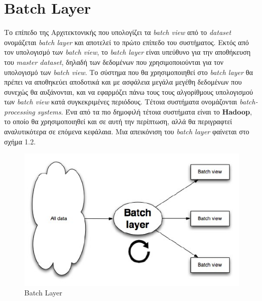 \section{Batch Layer}
Το επίπεδο της Αρχιτεκτονικής που υπολογίζει τα \textit{batch view} από το \textit{dataset} ονομάζεται \textit{batch layer} και αποτελεί το πρώτο επίπεδο του συστήματος. Εκτός από τον υπολογισμό των \textit{batch view}, το \textit{batch layer} είναι υπεύθυνο για την αποθήκευση του \textit{master dataset}, δηλαδή των δεδομένων που χρησιμοποιούνται για τον υπολογισμό των \textit{batch view}. Το σύστημα που θα χρησιμοποιηθεί στο \textit{batch layer} θα πρέπει να αποθηκεύει αποδοτικά και με ασφάλεια μεγάλα μεγέθη δεδομένων που συνεχώς θα αυξάνονται, και να εφαρμόζει πάνω τους τους αλγορίθμους υπολογισμού των \textit{batch view} κατά συγκεκριμένες περιόδους. Τέτοια συστήματα ονομάζονται \textit{batch-processing
systems}. Ένα από τα πιο δημοφιλή τέτοια συστήματα είναι το \textbf{Hadoop}, το οποίο θα χρησιμοποιηθεί και σε αυτή την περίπτωση, αλλά θα περιγραφτεί αναλυτικότερα σε επόμενα κεφάλαια.
\newline
Μια απεικόνιση του \textit{batch layer} φαίνεται στο σχήμα 1.2.

\begin{figure}[t]
\caption{Batch Layer}
\includegraphics[width=12cm]{images/batch_layer.jpg}
\centering
\end{figure}
\clearpage

